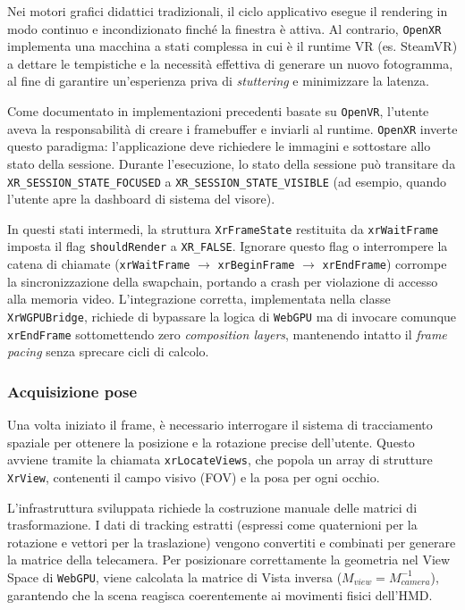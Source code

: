\documentclass[a4paper, 11pt, twoside]{report}
\begin{document}
Nei motori grafici didattici tradizionali, il ciclo applicativo esegue il rendering in modo continuo e incondizionato
finché la finestra è attiva. Al contrario, \texttt{\gls{OpenXR}} implementa una macchina a stati complessa in cui è il
runtime VR (es. SteamVR) a dettare le tempistiche e la necessità effettiva di generare un nuovo fotogramma, al fine di
garantire un'esperienza priva di \textit{stuttering} e minimizzare la latenza.

Come documentato in implementazioni precedenti basate su \texttt{\gls{OpenVR}}, l'utente aveva la responsabilità di
creare i framebuffer e inviarli al runtime.
\texttt{\gls{OpenXR}} inverte questo paradigma: l'applicazione deve richiedere le immagini e sottostare allo stato della
sessione.
Durante l'esecuzione, lo stato della sessione può transitare da \texttt{XR\_SESSION\_STATE\_FOCUSED} a
\texttt{XR\_SESSION\_STATE\_VISIBLE} (ad esempio, quando l'utente apre la dashboard di sistema del visore).

In questi stati intermedi, la struttura \texttt{XrFrameState} restituita da \texttt{xrWaitFrame} imposta il flag
\texttt{shouldRender} a \texttt{XR\_FALSE}. Ignorare questo flag o interrompere la catena di chiamate
(\texttt{xrWaitFrame} $\rightarrow$ \texttt{xrBeginFrame} $\rightarrow$ \texttt{xrEndFrame}) corrompe la
sincronizzazione della swapchain, portando a crash per violazione di accesso alla memoria video.
L'integrazione corretta, implementata nella classe \texttt{XrWGPUBridge}, richiede di bypassare la logica di
\texttt{WebGPU} ma di invocare comunque \texttt{xrEndFrame} sottomettendo zero \textit{composition layers},
mantenendo intatto il \textit{frame pacing} senza sprecare cicli di calcolo.

\subsubsection{Acquisizione pose}

Una volta iniziato il frame, è necessario interrogare il sistema di tracciamento spaziale per ottenere la posizione e la
rotazione precise dell'utente. Questo avviene tramite la chiamata \texttt{xrLocateViews}, che popola un array di
strutture \texttt{XrView}, contenenti il campo visivo (FOV) e la posa per ogni occhio.

L'infrastruttura sviluppata richiede la costruzione manuale delle matrici di trasformazione. I dati di tracking estratti
(espressi come quaternioni per la rotazione e vettori per la traslazione) vengono convertiti e combinati per generare la
matrice della telecamera. Per posizionare correttamente la geometria nel View Space di \texttt{WebGPU}, viene calcolata
la matrice di Vista inversa ($M_{view} = M_{camera}^{-1}$), garantendo che la scena reagisca coerentemente ai movimenti
fisici dell'HMD.
\end{document}
